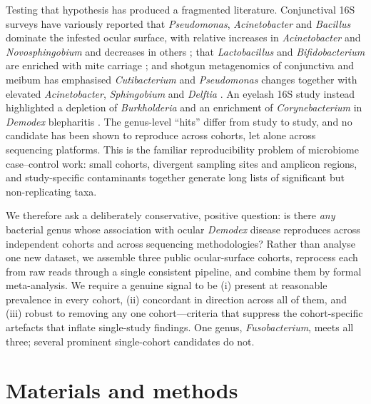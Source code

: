 \documentclass[11pt]{article}
\newcommand{\demodex}{\textit{Demodex}}
\begin{document}
Testing that hypothesis has produced a fragmented literature. Conjunctival 16S
surveys have variously reported that \textit{Pseudomonas}, \textit{Acinetobacter}
and \textit{Bacillus} dominate the infested ocular surface, with relative
increases in \textit{Acinetobacter} and \textit{Novosphingobium} and decreases in
others \citep{liang2021}; that \textit{Lactobacillus} and \textit{Bifidobacterium}
are enriched with mite carriage \citep{yan2020}; and shotgun metagenomics of
conjunctiva and meibum
has emphasised \textit{Cutibacterium} and \textit{Pseudomonas} changes together
with elevated \textit{Acinetobacter}, \textit{Sphingobium} and \textit{Delftia}
\citep{fu2022}. An eyelash 16S study instead highlighted a depletion of
\textit{Burkholderia} and an enrichment of \textit{Corynebacterium} in \demodex{}
blepharitis \citep{zou2024}. The genus-level ``hits'' differ from study to study,
and no candidate has been shown to reproduce across cohorts, let alone across
sequencing platforms. This is the familiar reproducibility problem of microbiome
case--control work: small cohorts, divergent sampling sites and amplicon regions,
and study-specific contaminants together generate long lists of significant but
non-replicating taxa.

We therefore ask a deliberately conservative, positive question: is there
\emph{any} bacterial genus whose association with ocular \demodex{} disease
reproduces across independent cohorts and across sequencing methodologies? Rather
than analyse one new dataset, we assemble three public ocular-surface cohorts,
reprocess each from raw reads through a single consistent pipeline, and combine
them by formal meta-analysis. We require a genuine signal to be (i) present at
reasonable prevalence in every cohort, (ii) concordant in direction across all of
them, and (iii) robust to removing any one cohort---criteria that suppress the
cohort-specific artefacts that inflate single-study findings. One genus,
\textit{Fusobacterium}, meets all three; several prominent single-cohort
candidates do not.

\section{Materials and methods}
\end{document}
